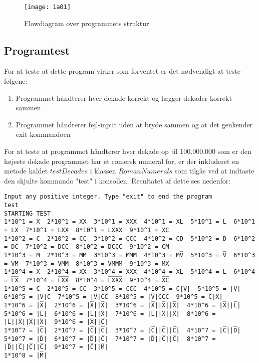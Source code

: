 	\begin{figure}[h!]
	  \centering
	      \texttt{[image: 1a01]}
	  \caption{Flowdiagram over programmets struktur}\label{fig:1a01}
	\end{figure}
		 
	



\subsection{Programtest}
	For at teste at dette program virker som forventet er det nødvendigt at teste følgene:
 	\begin{enumerate}
 		\item Programmet håndterer hver dekade korrekt og lægger dekader korrekt sammen
 		\item Programmet håndterer fejl-input uden at bryde sammen og at det genkender exit kommandoen
 	\end{enumerate}
 	For at teste at programmet håndterer hver dekade op til 100.000.000 som er den højeste dekade programmet har et romersk numeral for, er der inkluderet en metode kaldet $testDecades$ i klassen $RomanNumerals$ som tilgås ved at indtaste den skjulte kommando "test" i konsollen. Resultatet af dette ses nedenfor:
	\begin{lstlisting}[caption=output fra kørsel af testDecades]
Input any positive integer. Type "exit" to end the program
test
STARTING TEST
1*10^1 = X  2*10^1 = XX  3*10^1 = XXX  4*10^1 = XL  5*10^1 = L  6*10^1 = LX  7*10^1 = LXX  8*10^1 = LXXX  9*10^1 = XC  
1*10^2 = C  2*10^2 = CC  3*10^2 = CCC  4*10^2 = CD  5*10^2 = D  6*10^2 = DC  7*10^2 = DCC  8*10^2 = DCCC  9*10^2 = CM  
1*10^3 = M  2*10^3 = MM  3*10^3 = MMM  4*10^3 = MV̅  5*10^3 = V̅  6*10^3 = V̅M  7*10^3 = V̅MM  8*10^3 = V̅MMM  9*10^3 = MX̅  
1*10^4 = X̅  2*10^4 = X̅X̅  3*10^4 = X̅X̅X̅  4*10^4 = X̅L̅  5*10^4 = L̅  6*10^4 = L̅X̅  7*10^4 = L̅X̅X̅  8*10^4 = L̅X̅X̅X̅  9*10^4 = X̅C̅  
1*10^5 = C̅  2*10^5 = C̅C̅  3*10^5 = C̅C̅C̅  4*10^5 = C̅|V̅|  5*10^5 = |V̅|  6*10^5 = |V̅|C̅  7*10^5 = |V̅|C̅C̅  8*10^5 = |V̅|C̅C̅C̅  9*10^5 = C̅|X̅|  
1*10^6 = |X̅|  2*10^6 = |X̅||X̅|  3*10^6 = |X̅||X̅||X̅|  4*10^6 = |X̅||L̅|  5*10^6 = |L̅|  6*10^6 = |L̅||X̅|  7*10^6 = |L̅||X̅||X̅|  8*10^6 = |L̅||X̅||X̅||X̅|  9*10^6 = |X̅||C̅|  
1*10^7 = |C̅|  2*10^7 = |C̅||C̅|  3*10^7 = |C̅||C̅||C̅|  4*10^7 = |C̅||D̅|  5*10^7 = |D̅|  6*10^7 = |D̅||C̅|  7*10^7 = |D̅||C̅||C̅|  8*10^7 = |D̅||C̅||C̅||C̅|  9*10^7 = |C̅||M̅|  
1*10^8 = |M̅|  
	\end{lstlisting}
